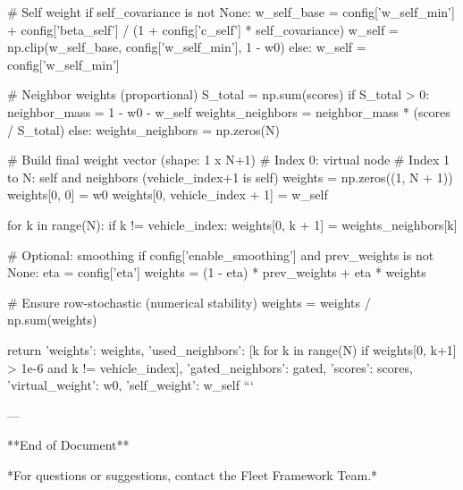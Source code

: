     # Self weight
    if self_covariance is not None:
        w_self_base = config['w_self_min'] + config['beta_self'] / (1 + config['c_self'] * self_covariance)
        w_self = np.clip(w_self_base, config['w_self_min'], 1 - w0)
    else:
        w_self = config['w_self_min']
    
    # Neighbor weights (proportional)
    S_total = np.sum(scores)
    if S_total > 0:
        neighbor_mass = 1 - w0 - w_self
        weights_neighbors = neighbor_mass * (scores / S_total)
    else:
        weights_neighbors = np.zeros(N)
    
    # Build final weight vector (shape: 1 x N+1)
    # Index 0: virtual node
    # Index 1 to N: self and neighbors (vehicle_index+1 is self)
    weights = np.zeros((1, N + 1))
    weights[0, 0] = w0
    weights[0, vehicle_index + 1] = w_self
    
    for k in range(N):
        if k != vehicle_index:
            weights[0, k + 1] = weights_neighbors[k]
    
    # Optional: smoothing
    if config['enable_smoothing'] and prev_weights is not None:
        eta = config['eta']
        weights = (1 - eta) * prev_weights + eta * weights
    
    # Ensure row-stochastic (numerical stability)
    weights = weights / np.sum(weights)
    
    return {
        'weights': weights,
        'used_neighbors': [k for k in range(N) if weights[0, k+1] > 1e-6 and k != vehicle_index],
        'gated_neighbors': gated,
        'scores': scores,
        'virtual_weight': w0,
        'self_weight': w_self
    }
```

---

**End of Document**

*For questions or suggestions, contact the Fleet Framework Team.*
